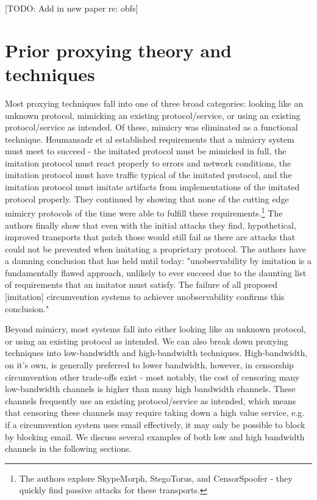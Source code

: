 \documentclass[12pt]{report}
\begin{document}
[TODO: Add in new paper re: obfs]

\section{Prior proxying theory and techniques}
\label{prior}

Most proxying techniques fall into one of three broad categories: looking like an unknown protocol, mimicking an existing protocol/service, or using an existing protocol/service as intended. Of these, mimicry was eliminated as a functional technique. Houmansadr et al established requirements that a mimicry system must meet to succeed - the imitated protocol must be mimicked in full, the imitation protocol must react properly to errors and network conditions, the imitation protocol must have traffic typical of the imitated protocol, and the imitation protocol must imitate artifacts from implementations of the imitated protocol properly.\cite{parrot} They continued by showing that none of the cutting edge mimicry protocols of the time were able to fulfill these requirements.\footnote{The authors explore SkypeMorph, StegoTorus, and CensorSpoofer - they quickly find passive attacks for these transports.\cite{skypemorph}\cite{stegotorus}\cite{censorspoofer}\cite{parrot}} The authors finally show that even with the initial attacks they find, hypothetical, improved transports that patch those would still fail as there are attacks that could not be prevented when imitating a proprietary protocol. The authors have a damning conclusion that has held until today: "unobservability by imitation is a fundamentally flawed approach, unlikely to ever succeed due to the daunting list of requirements that an imitator must satisfy. The failure of all proposed [imitation] circumvention systems to achiever unobservability confirms this conclusion."\cite{parrot}

Beyond mimicry, most systems fall into either looking like an unknown protocol, or using an existing protocol as intended. We can also break down proxying techniques into low-bandwidth and high-bandwidth techniques. High-bandwidth, on it's own, is generally preferred to lower bandwidth, however, in censorship circumvention other trade-offs exist - most notably, the cost of censoring many low-bandwidth channels is higher than many high bandwidth channels. These channels frequently use an existing protocol/service as intended, which means that censoring these channels may require taking down a high value service, e.g. if a circumvention system uses email effectively, it may only be possible to block by blocking email. We discuss several examples of both low and high bandwidth channels in the following sections.
\end{document}
